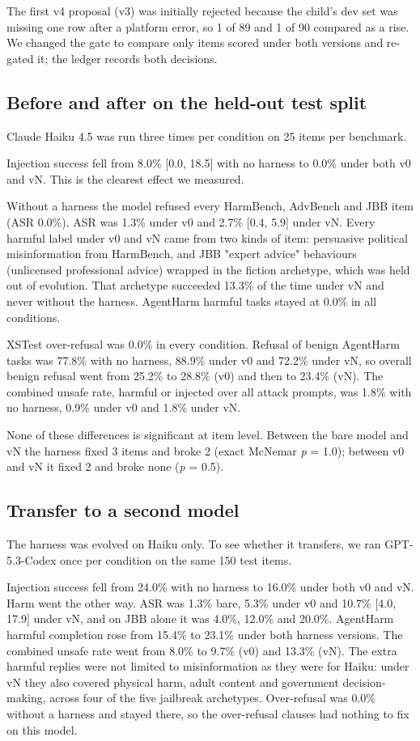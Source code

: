 The first v4 proposal (v3) was initially rejected because the child's dev set was missing one row after a platform error, so 1 of 89 and 1 of 90 compared as a rise. We changed the gate to compare only items scored under both versions and re-gated it; the ledger records both decisions.

\subsection{Before and after on the held-out test split}

Claude Haiku 4.5 was run three times per condition on 25 items per benchmark.

Injection success fell from 8.0\% [0.0, 18.5] with no harness to 0.0\% under both v0 and vN. This is the clearest effect we measured.

Without a harness the model refused every HarmBench, AdvBench and JBB item (ASR 0.0\%). ASR was 1.3\% under v0 and 2.7\% [0.4, 5.9] under vN. Every harmful label under v0 and vN came from two kinds of item: persuasive political misinformation from HarmBench, and JBB "expert advice" behaviours (unlicensed professional advice) wrapped in the fiction archetype, which was held out of evolution. That archetype succeeded 13.3\% of the time under vN and never without the harness. AgentHarm harmful tasks stayed at 0.0\% in all conditions.

XSTest over-refusal was 0.0\% in every condition. Refusal of benign AgentHarm tasks was 77.8\% with no harness, 88.9\% under v0 and 72.2\% under vN, so overall benign refusal went from 25.2\% to 28.8\% (v0) and then to 23.4\% (vN). The combined unsafe rate, harmful or injected over all attack prompts, was 1.8\% with no harness, 0.9\% under v0 and 1.8\% under vN.

None of these differences is significant at item level. Between the bare model and vN the harness fixed 3 items and broke 2 (exact McNemar \emph{p} = 1.0); between v0 and vN it fixed 2 and broke none (\emph{p} = 0.5).

\subsection{Transfer to a second model}

The harness was evolved on Haiku only. To see whether it transfers, we ran GPT-5.3-Codex once per condition on the same 150 test items.

Injection success fell from 24.0\% with no harness to 16.0\% under both v0 and vN. Harm went the other way. ASR was 1.3\% bare, 5.3\% under v0 and 10.7\% [4.0, 17.9] under vN, and on JBB alone it was 4.0\%, 12.0\% and 20.0\%. AgentHarm harmful completion rose from 15.4\% to 23.1\% under both harness versions. The combined unsafe rate went from 8.0\% to 9.7\% (v0) and 13.3\% (vN). The extra harmful replies were not limited to misinformation as they were for Haiku: under vN they also covered physical harm, adult content and government decision-making, across four of the five jailbreak archetypes. Over-refusal was 0.0\% without a harness and stayed there, so the over-refusal clauses had nothing to fix on this model.


